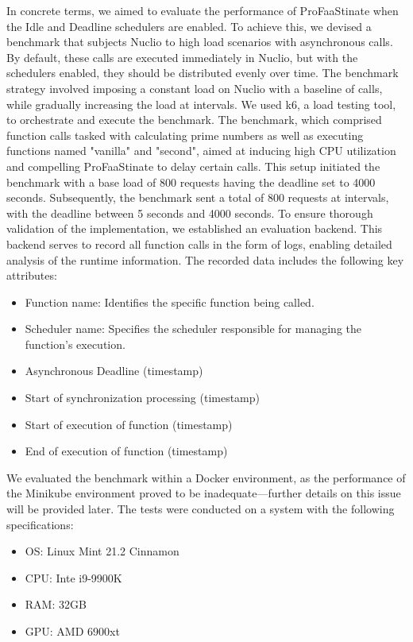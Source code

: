 In concrete terms, we aimed to evaluate the performance of ProFaaStinate when the Idle and Deadline schedulers are enabled. To achieve this, we devised a benchmark that subjects Nuclio to high load scenarios with asynchronous calls. By default, these calls are executed immediately in Nuclio, but with the schedulers enabled, they should be distributed evenly over time. The benchmark strategy involved imposing a constant load on Nuclio with a baseline of calls, while gradually increasing the load at intervals. We used k6, a load testing tool, to orchestrate and execute the benchmark.
The benchmark, which comprised function calls tasked with calculating prime numbers as well as executing functions named "vanilla" and "second", aimed at inducing high CPU utilization and compelling ProFaaStinate to delay certain calls. This setup initiated the benchmark with a base load of 800 requests having the deadline set to 4000 seconds. Subsequently, the benchmark sent a total of 800 requests at intervals, with the deadline between 5 seconds and 4000 seconds.
To ensure thorough validation of the implementation, we established an evaluation backend. This backend serves to record all function calls in the form of logs, enabling detailed analysis of the runtime information. The recorded data includes the following key attributes:
\begin{itemize}
    \item Function name: Identifies the specific function being called.
    \item Scheduler name: Specifies the scheduler responsible for managing the function's execution.
    \item Asynchronous  Deadline (timestamp)
    \item Start of synchronization processing (timestamp)
    \item Start of execution of function (timestamp)
    \item End of execution of function (timestamp)
\end{itemize}
We evaluated the benchmark within a Docker environment, as the performance of the Minikube environment proved to be inadequate—further details on this issue will be provided later. The tests were conducted on a system with the following specifications:
\begin{itemize}
    \item OS: Linux Mint 21.2 Cinnamon
    \item CPU: Inte i9-9900K
    \item RAM: 32GB
    \item GPU: AMD 6900xt
\end{itemize}

